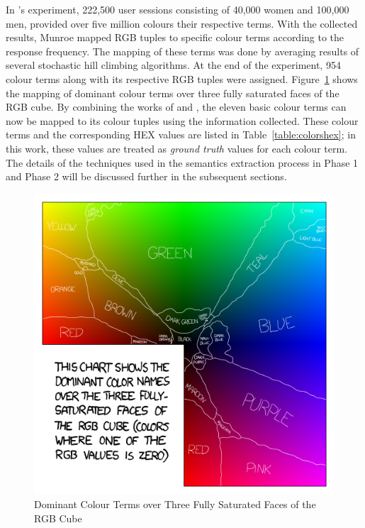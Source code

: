 In 's experiment, 222,500 user sessions consisting of 40,000 women and 100,000 men, provided over five million colours their respective terms. With the collected results, Munroe mapped RGB tuples to specific colour terms according to the response frequency.
The mapping of these terms was done by averaging results of several stochastic hill climbing algorithms. At the end of the experiment, 954 colour terms along with its respective RGB tuples were assigned.
Figure~\ref{fig:xkcd} shows the mapping of dominant colour terms over three fully saturated faces of the RGB cube.
By combining the works of  and , the eleven basic colour terms can now be mapped to its colour tuples using the information collected. These colour terms and the corresponding HEX values are listed in Table~\ref{table:colorshex}; in this work, these values are treated as \textit{ground truth} values for each colour term.
The details of the techniques used in the semantics extraction process in Phase 1 and Phase 2 will be discussed further in the subsequent sections.

\begin{figure}[!hbt]\centering
\includegraphics[width=.6\textwidth]{image/general/xkcd.png}
\caption{Dominant Colour Terms over Three Fully Saturated Faces of the RGB Cube}
\label{fig:xkcd}
\end{figure}



